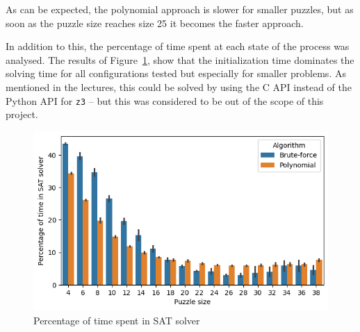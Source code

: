 \documentclass[12pt]{article}
\begin{document}
As can be expected, the polynomial approach is slower for smaller puzzles, but as soon as the puzzle size reaches size 25 it becomes the faster approach.

In addition to this, the percentage of time spent at each state of the process was analysed.
The results of Figure~\ref{fig:util}, show that the initialization time dominates the solving time for all configurations tested but especially for smaller problems.
As mentioned in the lectures, this could be solved by using the C API instead of the Python API for \texttt{z3} -- but this was considered to be out of the scope of this project.

\begin{figure}[H]
  \includegraphics[scale=0.5]{util.png}
  \centering
  \caption{Percentage of time spent in SAT solver}
  \label{fig:util}
\end{figure}
\end{document}
